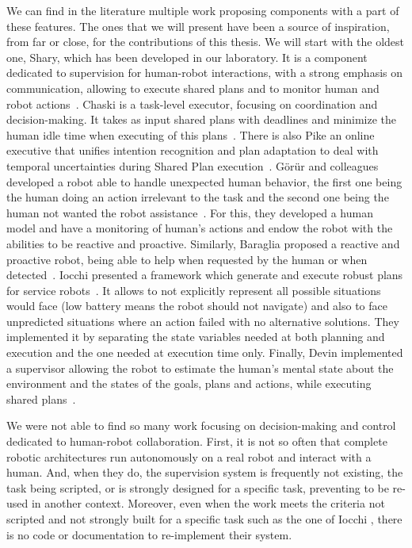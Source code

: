 \documentclass[a4paper,11pt,twoside]{StyleThese}
\begin{document}
We can find in the literature multiple work proposing components with a part of these features. The ones that we will present have been a source of inspiration, from far or close, for the contributions of this thesis. We will start with the oldest one, Shary, which has been developed in our laboratory. It is a component dedicated to supervision for human-robot interactions, with a strong emphasis on communication, allowing to execute shared plans and to monitor human and robot actions~\cite{clodic_2009_shary}. Chaski is a task-level executor, focusing on coordination and decision-making. It takes as input shared plans with deadlines and minimize the human idle time when executing of this plans~\cite{shah_2011_improved}. There is also Pike an online executive that unifies intention recognition and plan adaptation to deal with temporal uncertainties during Shared Plan execution~\cite{karpas_2015_robust}. G\"{o}r\"{u}r and colleagues developed a robot able to handle unexpected human behavior, the first one being the human doing an action irrelevant to the task and the second one being the human not wanted the robot assistance~\cite{gorur_2017_toward, gorur_2018_social}. For this, they developed a human model and have a monitoring of human's actions and endow the robot with the abilities to be reactive and proactive. Similarly, Baraglia \etal{} proposed a reactive and proactive robot, being able to help when requested by the human or when detected~\cite{baraglia_2017_efficient}. Iocchi \etal{} presented a framework which generate and execute robust plans for service robots~\cite{iocchi_2016_practical}. It allows to not explicitly represent all possible situations would face (\eg low battery means the robot should not navigate) and also to face unpredicted situations where an action failed with no alternative solutions. They implemented it by separating the state variables needed at both planning and execution and the one needed at execution time only. Finally, Devin \etal{} implemented a supervisor allowing the robot to estimate the human's mental state about the environment and the states of the goals, plans and actions, while executing shared plans~\cite{devin_2016_implemented}.

\bigskip

We were not able to find so many work focusing on decision-making and control dedicated to human-robot collaboration. First, it is not so often that complete robotic architectures run autonomously on a real robot and interact with a human. And, when they do, the supervision system is frequently not existing, the task being scripted, or is strongly designed for a specific task, preventing to be re-used in another context. Moreover, even when the work meets the criteria not scripted and not strongly built for a specific task such as the one of Iocchi \etal{}, there is no code or documentation to re-implement their system.
\end{document}
